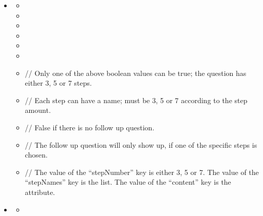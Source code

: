 \documentclass[a4paper]{scrreprt}
\begin{document}
\begin{itemize}
                    \item {}
                        \begin{itemize}
                            \item {}
                            \item {}
                            \item {}
                            \item {}
                            \item {}
                            \item {}
                            \item {}
                                \par // Only one of the above boolean values can be true; the question has either 3, 5 or 7 steps.
                            \item {}
                                \par // Each step can have a name;  must be 3, 5 or 7 according to the step amount.
                            \item {}
                                \par // False if there is no follow up question.
                            \item {}
                                \par // The follow up question will only show up, if one of the specific steps is chosen.
                            \item {}
                               \par // The value of the “stepNumber” key is either 3, 5 or 7. The value of the “stepNames” key is the  list. The value of the “content” key is the  attribute.
                        \end{itemize}

                    \item {}
                        \begin{itemize}
                            \item {}
                        \end{itemize}


\end{itemize}
\end{document}
